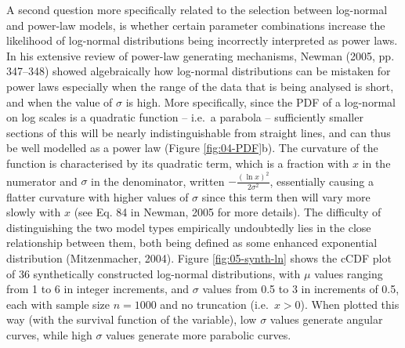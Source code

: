 \documentclass[
  12pt,
]{book}
\begin{document}
A second question more specifically related to the selection between log-normal and power-law models, is whether certain parameter combinations increase the likelihood of log-normal distributions being incorrectly interpreted as power laws. In his extensive review of power-law generating mechanisms, Newman (2005, pp. 347--348) showed algebraically how log-normal distributions can be mistaken for power laws especially when the range of the data that is being analysed is short, and when the value of \(\sigma\) is high. More specifically, since the PDF of a log-normal on log scales is a quadratic function -- i.e.~a parabola -- sufficiently smaller sections of this will be nearly indistinguishable from straight lines, and can thus be well modelled as a power law (Figure \ref{fig:04-PDF}b). The curvature of the function is characterised by its quadratic term, which is a fraction with \(x\) in the numerator and \(\sigma\) in the denominator, written \(-\frac{(\ln x)^2}{2\sigma^2}\), essentially causing a flatter curvature with higher values of \(\sigma\) since this term then will vary more slowly with \(x\) (see Eq. 84 in Newman, 2005 for more details). The difficulty of distinguishing the two model types empirically undoubtedly lies in the close relationship between them, both being defined as some enhanced exponential distribution (Mitzenmacher, 2004). Figure \ref{fig:05-synth-ln} shows the cCDF plot of 36 synthetically constructed log-normal distributions, with \(\mu\) values ranging from 1 to 6 in integer increments, and \(\sigma\) values from 0.5 to 3 in increments of 0.5, each with sample size \(n = 1000\) and no truncation (i.e.~\(x > 0\)). When plotted this way (with the survival function of the variable), low \(\sigma\) values generate angular curves, while high \(\sigma\) values generate more parabolic curves.
\end{document}
